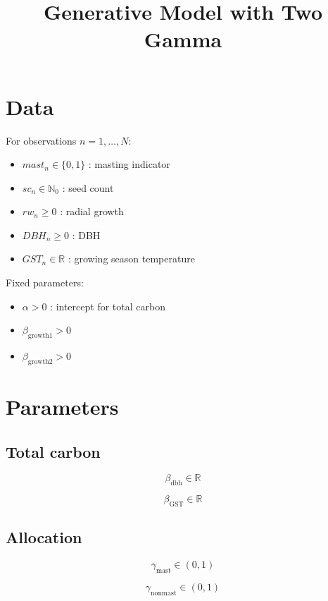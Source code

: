 \documentclass[11pt]{article}
\begin{document}
\title{Generative Model with Two Gamma}
\author{}
\date{}
\maketitle

\section*{Data}

For observations $n = 1, \dots, N$:

\begin{itemize}
    \item $mast_n \in \{0,1\}$ : masting indicator
    \item $sc_n \in \mathbb{N}_0$ : seed count
    \item $rw_n \ge 0$ : radial growth
    \item $DBH_n \ge 0$ : DBH
    \item $GST_n \in \mathbb{R}$ : growing season temperature
\end{itemize}

Fixed parameters:

\begin{itemize}
    \item $\alpha > 0$ : intercept for total carbon
    \item $\beta_{\text{growth1}} > 0$
    \item $\beta_{\text{growth2}} > 0$
\end{itemize}

\section*{Parameters}

\subsection*{Total carbon}

\[
\beta_{\text{dbh}} \in \mathbb{R}
\]

\[
\beta_{\text{GST}} \in \mathbb{R}
\]

\subsection*{Allocation}

\[
\gamma_{\text{mast}} \in (0,1)
\]

\[
\gamma_{\text{nonmast}} \in (0,1)
\]
\end{document}
